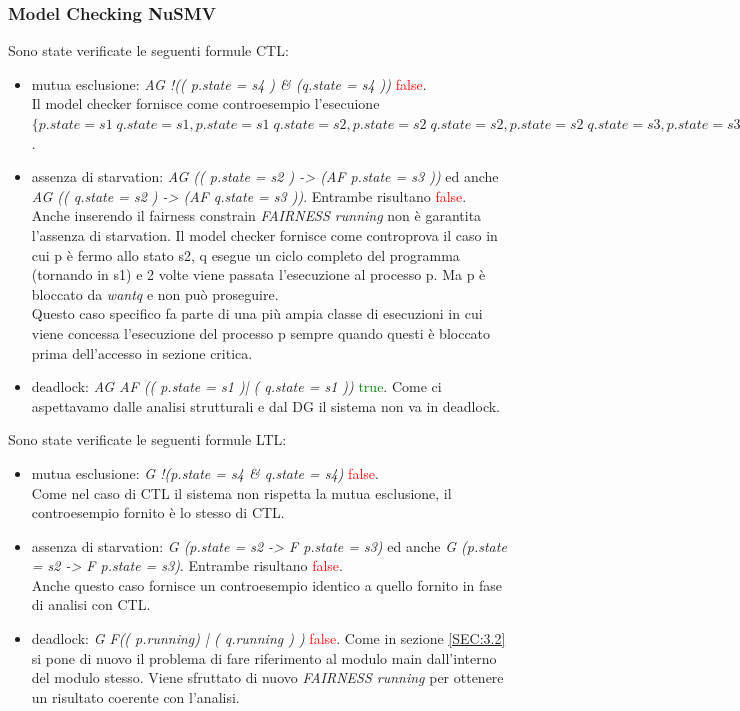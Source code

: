 \documentclass[a4paper]{article}
\begin{document}
\subsubsection{Model Checking NuSMV}
Sono state verificate le seguenti formule CTL:
\begin{itemize}
        \item mutua esclusione: \textit{AG !(( p.state = s4 ) \& (q.state = s4 ))} \textcolor{red}{false}.\\
		Il model checker fornisce come controesempio l'esecuione $\{p.state=s1\;q.state=s1,p.state=s1\;q.state=s2,p.state=s2\;q.state=s2,p.state=s2\;q.state=s3,p.state=s3\;q.state=s3,p.state=s3\;q.state=s4,p.state=s4\;q.state=s4\}$.
        \item assenza di starvation: \textit{AG (( p.state = s2 ) -> (AF p.state = s3 ))} ed anche \textit{AG (( q.state = s2 ) -> (AF q.state = s3 ))}. Entrambe risultano \textcolor{red}{false}.\\
		Anche inserendo il fairness constrain \textit{FAIRNESS running} non è garantita l'assenza di starvation. Il model checker fornisce come controprova il caso in cui p è fermo allo stato s2, q esegue un ciclo completo del programma (tornando in s1) e 2 volte viene passata l'esecuzione al processo p. Ma p è bloccato da \textit{wantq} e non può proseguire.\\
		Questo caso specifico fa parte di una più ampia classe di esecuzioni in cui viene concessa l'esecuzione del processo p sempre quando questi è bloccato prima dell'accesso in sezione critica.
        \item deadlock: \textit{AG AF (( p.state = s1 )| ( q.state = s1 ))} \textcolor{green}{true}. Come ci aspettavamo dalle analisi strutturali e dal DG il sistema non va in deadlock.
\end{itemize}
Sono state verificate le seguenti formule LTL:
\begin{itemize}
        \item mutua esclusione: \textit{G !(p.state = s4 \& q.state = s4)} \textcolor{red}{false}.\\
		Come nel caso di CTL il sistema non rispetta la mutua esclusione, il controesempio fornito è lo stesso di CTL.
        \item assenza di starvation: \textit{G (p.state = s2 ->  F p.state = s3)} ed anche \textit{G (p.state = s2 ->  F p.state = s3)}. Entrambe risultano \textcolor{red}{false}.\\
		Anche questo caso fornisce un controesempio identico a quello fornito in fase di analisi con CTL.
        \item deadlock: \textit{G F(( p.running) | ( q.running ) )} \textcolor{red}{false}. 
		Come in sezione \ref{SEC:3.2} si pone di nuovo il problema di fare riferimento al modulo main dall'interno del modulo stesso. Viene sfruttato di nuovo \textit{FAIRNESS running} per ottenere un risultato coerente con l'analisi.
\end{itemize}
\end{document}
